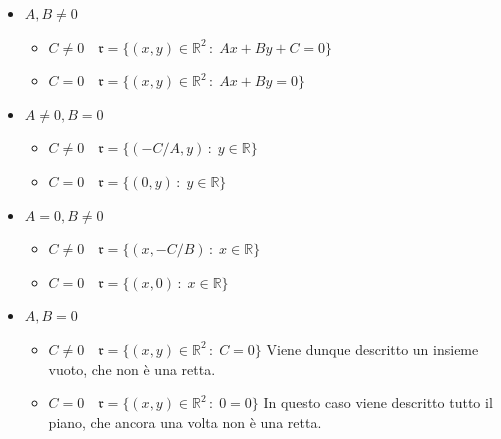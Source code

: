 \documentclass{article}
\theoremstyle{plain}
\theoremstyle{definition}
\theoremstyle{remark}
\begin{document}
\vspace{10pt}

\begin{itemize}
    \item $A,B\neq0$
    \begin{itemize}
        \item $C\neq0\quad\mathfrak{r}=\{(x,y)\in\mathbb{R}^2\,:\;Ax+By+C=0\}$
        \item $C=0\quad\mathfrak{r}=\{(x,y)\in\mathbb{R}^2\,:\;Ax+By=0\}$
    \end{itemize}
    \item $A\neq0,B=0$
    \begin{itemize}
        \item $C\neq0\quad\mathfrak{r}=\{(-C/A,y)\,:\;y\in\mathbb{R}\}$
        \item $C=0\quad\mathfrak{r}=\{(0,y)\,:\;y\in\mathbb{R}\}$
    \end{itemize}
    \item $A=0,B\neq0$
    \begin{itemize}
        \item $C\neq0\quad\mathfrak{r}=\{(x,-C/B)\,:\;x\in\mathbb{R}\}$
        \item $C=0\quad\mathfrak{r}=\{(x,0)\,:\;x\in\mathbb{R}\}$
    \end{itemize}
    \item $A,B=0$
    \begin{itemize}
        \item $C\neq0\quad\mathfrak{r}=\{(x,y)\in\mathbb{R}^2\,:\;C=0\}$
        Viene dunque descritto un insieme vuoto, che non è una retta.
        \item $C=0\quad\mathfrak{r}=\{(x,y)\in\mathbb{R}^2\,:\;0=0\}$
        In questo caso viene descritto tutto il piano, che ancora una volta non è una retta.
    \end{itemize}
\end{itemize}

\vspace{10pt}
\end{document}
